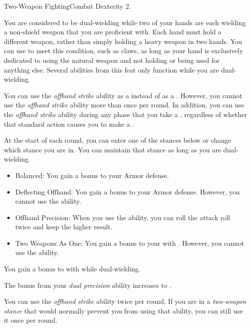    \begin{feat}{Two-Weapon Fighting}{Combat}
        \featpre Dexterity 2.

         You are considered to be dual-wielding while two of your hands are each wielding a non-shield weapon that you are proficient with.
        Each hand must hold a different weapon, rather than simply holding a heavy weapon in two hands.
        You can use  to meet this condition, such as claws, as long as your hand is exclusively dedicated to using the natural weapon and not holding or being used for anything else.
        Several abilities from this feat only function while you are dual-wielding.

         You can use the \textit{offhand strike} ability as a  instead of as a .
        However, you cannot use the \textit{offhand strike} ability more than once per round.
        In addition, you can use the \textit{offhand strike} ability during any phase that you take a , regardless of whether that standard action causes you to make a .

         At the start of each round, you can enter one of the stances below or change which stance you are in.
        You can maintain that stance as long as you are dual-wielding.
        \begin{itemize}
            \item Balanced: You gain a  bonus to your Armor defense.
            \item Deflecting Offhand: You gain a  bonus to your Armor defense.
                However, you cannot use the  ability.
            \item Offhand Precision: When you use the  ability, you can roll the attack roll twice and keep the higher result.
            \item Two Weapons As One: You gain a  bonus to your  with .
                However, you cannot use the  ability.
        \end{itemize}

         You gain a  bonus to  with  while dual-wielding.

         The bonus from your \textit{dual precision} ability increases to .

         You can use the \textit{offhand strike} ability twice per round.
        If you are in a \textit{two-weapon stance} that would normally prevent you from using that ability, you can still use it once per round.
    \end{feat}

